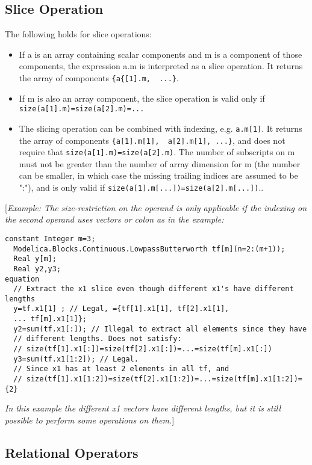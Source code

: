 \subsection{Slice Operation}

The following holds for slice operations:

\begin{itemize}
\item
  If a is an array containing scalar components and m is a component of
  those components, the expression a.m is interpreted as a slice operation. It returns the array of components \lstinline!{a{[1].m,  ...}!.
\item
  If m is also an array component, the slice operation is valid only if \lstinline!size(a[1].m)=size(a[2].m)=...!
\item
  The slicing operation can be combined with indexing, e.g. \lstinline!a.m[1]!.
  It returns the array of components  \lstinline!{a[1].m[1],  a[2].m[1], ...}!, and does not require that
   \lstinline!size(a[1].m)=size(a[2].m)!. The number of subscripts on m must
  not be greater than the number of array dimension for m (the number
  can be smaller, in which case the missing trailing indices are assumed
  to be ":"), and is only valid if   \lstinline!size(a[1].m[...])=size(a[2].m[...])!..
\end{itemize}

{[}\emph{Example: The size-restriction on the operand is only applicable
if the indexing on the second operand uses vectors or colon as in the
example:}

\begin{lstlisting}[language=modelica]
  constant Integer m=3;
  Modelica.Blocks.Continuous.LowpassButterworth tf[m](n=2:(m+1));
  Real y[m];
  Real y2,y3;
equation
  // Extract the x1 slice even though different x1's have different lengths
  y=tf.x1[1] ; // Legal, ={tf[1].x1[1], tf[2].x1[1],
  ... tf[m].x1[1]};
  y2=sum(tf.x1[:]); // Illegal to extract all elements since they have
  // different lengths. Does not satisfy:
  // size(tf[1].x1[:])=size(tf[2].x1[:])=...=size(tf[m].x1[:])
  y3=sum(tf.x1[1:2]); // Legal.
  // Since x1 has at least 2 elements in all tf, and
  // size(tf[1].x1[1:2])=size(tf[2].x1[1:2])=...=size(tf[m].x1[1:2])={2}
\end{lstlisting}
\emph{In this example the different x1 vectors have different lengths,
but it is still possible to perform some operations on them.}{]}

\subsection{Relational Operators}

